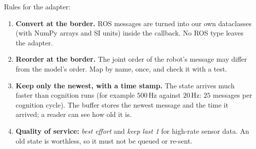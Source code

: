 Rules for the adapter:
\begin{enumerate}[nosep]
  \item \textbf{Convert at the border.} ROS messages are turned into our own dataclasses (with NumPy arrays and SI units) inside the callback. No ROS type leaves the adapter.
  \item \textbf{Reorder at the border.} The joint order of the robot's message may differ from the model's order. Map by name, once, and check it with a test.
  \item \textbf{Keep only the newest, with a time stamp.} The state arrives much faster than cognition runs (for example $500$\,Hz against $20$\,Hz: $25$ messages per cognition cycle). The buffer stores the newest message and the time it arrived; a reader can see how old it is.
  \item \textbf{Quality of service:} \emph{best effort} and \emph{keep last 1} for high-rate sensor data. An old state is worthless, so it must not be queued or re-sent.
\end{enumerate}


